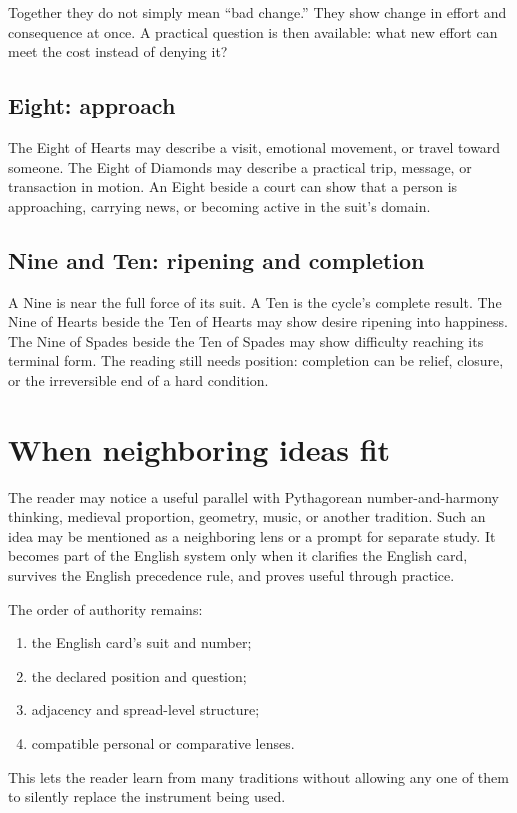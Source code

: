 Together they do not simply mean ``bad change.'' They show change in effort and
consequence at once. A practical question is then available: what new effort
can meet the cost instead of denying it?

\subsection{Eight: approach}

The Eight of Hearts may describe a visit, emotional movement, or travel toward
someone. The Eight of Diamonds may describe a practical trip, message, or
transaction in motion. An Eight beside a court can show that a person is
approaching, carrying news, or becoming active in the suit's domain.

\subsection{Nine and Ten: ripening and completion}

A Nine is near the full force of its suit. A Ten is the cycle's complete result.
The Nine of Hearts beside the Ten of Hearts may show desire ripening into
happiness. The Nine of Spades beside the Ten of Spades may show difficulty
reaching its terminal form. The reading still needs position: completion can be
relief, closure, or the irreversible end of a hard condition.

\section{When neighboring ideas fit}

The reader may notice a useful parallel with Pythagorean number-and-harmony
thinking, medieval proportion, geometry, music, or another tradition. Such an
idea may be mentioned as a neighboring lens or a prompt for separate study.
It becomes part of the English system only when it clarifies the English card,
survives the English precedence rule, and proves useful through practice.

The order of authority remains:

\begin{enumerate}
\item the English card's suit and number;
\item the declared position and question;
\item adjacency and spread-level structure;
\item compatible personal or comparative lenses.
\end{enumerate}

This lets the reader learn from many traditions without allowing any one of
them to silently replace the instrument being used.
